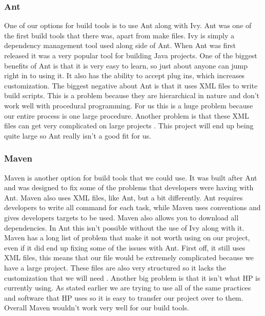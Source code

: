 \documentclass[onecolumn, draftclsnofoot,10pt, compsoc]{IEEEtran}
\begin{document}
\subsubsection{Ant}
One of our options for build tools is to use Ant along with Ivy. Ant was one of the first build tools that there was, apart from make files. Ivy is simply a dependency management tool used along side of Ant. When Ant was first released it was a very popular tool for building Java projects. One of the biggest benefits of Ant is that it is very easy to learn, so just about anyone can jump right in to using it. It also has the ability to accept plug ins, which increases customization. The biggest negative about Ant is that it uses XML files to write build scripts. This is a problem because they are hierarchical in nature and don't work well with procedural programming. For us this is a huge problem because our entire process is one large procedure. Another problem is that these XML files can get very complicated on large projects \cite{GradleAntMaven}. This project will end up being quite large so Ant really isn't a good fit for us.
\subsubsection{Maven}
Maven is another option for build tools that we could use. It was built after Ant and was designed to fix some of the problems that developers were having with Ant. Maven also uses XML files, like Ant, but a bit differently. Ant requires developers to write all command for each task, while Maven uses conventions and gives developers targets to be used. Maven also allows you to download all dependencies. In Ant this isn't possible without the use of Ivy along with it. Maven has a long list of problem that make it not worth using on our project, even if it did end up fixing some of the issues with Ant. First off, it still uses XML files, this means that our file would be extremely complicated because we have a large project. These files are also very structured so it lacks the customization that we will need \cite{GradleAntMaven}. Another big problem is that it isn't what HP is currently using. As stated earlier we are trying to use all of the same practices and software that HP uses so it is easy to transfer our project over to them. Overall Maven wouldn't work very well for our build tools.
\end{document}
